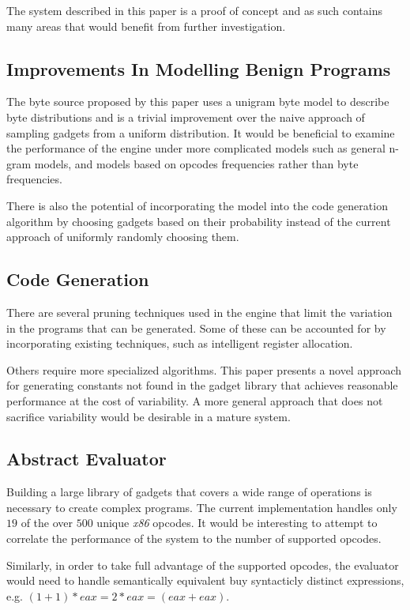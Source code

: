     The system described in this paper is a proof of concept and as such
    contains many areas that would benefit from further investigation.

    \subsection{Improvements In Modelling Benign Programs}

    The byte source proposed by this paper uses a unigram byte model to describe
    byte distributions and is a trivial improvement over the naive approach of
    sampling gadgets from a uniform distribution. It would be beneficial to
    examine the performance of the engine under more complicated models such as
    general n-gram models, and models based on opcodes frequencies rather than
    byte frequencies.

    There is also the potential of incorporating the model into the code
    generation algorithm by choosing gadgets based on their probability instead
    of the current approach of uniformly randomly choosing them.

    \subsection{Code Generation}

    There are several pruning techniques used in the engine that limit the
    variation in the programs that can be generated. Some of these can be
    accounted for by incorporating existing techniques, such as intelligent
    register allocation\cite{register-coloring}.

    Others require more specialized algorithms. This paper presents a novel
    approach for generating constants not found in the gadget library that
    achieves reasonable performance at the cost of variability. A more general
    approach that does not sacrifice variability would be desirable in a mature
    system.

    \subsection{Abstract Evaluator}

    Building a large library of gadgets that covers a wide range of operations
    is necessary to create complex programs. The current implementation handles
    only $19$ of the over $500$ unique \emph{x86} opcodes. It would be
    interesting to attempt to correlate the performance of the system to the
    number of supported opcodes.

    Similarly, in order to take full advantage of the supported opcodes, the
    evaluator would need to handle semantically equivalent buy syntacticly
    distinct expressions, e.g. $(1+1)*eax = 2*eax = (eax+eax)$.

%
